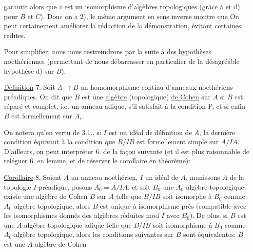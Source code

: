 
garantit alors que $v$ est un isomorphisme d'algèbres topologiques (grâce
à  et d) pour $B$ et $C$). Donc  on a 2), 
 le même argument en
sens inverse montre que  
On peut certainement améliorer la rédaction de la démonstration, évitant certaines redites.

Pour simplifier, nous nous restreindrons par la suite à des hypothèses
noethériennes (permettant de nous débarrasser en particulier de la désagréable hypothèse d) sur $B$).

\uline{Définition} 7. Soit $A\longrightarrow B$ un homomorphisme continu d'anneaux noethériens
préadiques. On dit que $B$ est une \uline{algèbre} (topologique) \uline{de Cohen} sur $A$
si  $B$ est séparé et complet, i.e.  un anneau adique,
  s'il satisfait à la condition P, et si enfin  $B$ est formellement
  sur $A$, 

On notera qu'en vertu de 3.1., si $I$ est un idéal de définition de $A$,
la dernière condition équivaut à la condition que $B/IB$ est formellement
simple sur $A/IA$. D'ailleurs, on peut interpréter 6. de la façon
suivante (et il est  plus raisonnable de reléguer 6. en lemme,
et de réserver le corollaire en théorème):

\uline{Corollaire} 8. Soient $A$ un anneau  noethérien, $I$ un idéal de $A$,
munissons $A$ de la topologie $I$-préadique, posons $A_0=A/IA$, et soit $B_0$ une
$A_0$-algèbre topologique.  existe une algèbre de Cohen $B$ sur $A$ telle
que $B/IB$ soit isomorphe à $B_0$ comme $A_0$-algèbre topologique,
alors $B$ est unique à  isomorphisme près
 (compatible avec les isomorphismes donnés des algèbres
 réduites mod $I$ avec $B_0$). De plus, si $B$ est une $A$-algèbre topologique adique telle que $B/IB$
soit isomorphisme à $B_0$ comme $A_0$-algèbre topologique, alors les conditions
suivantes sur $B$ sont équivalentes:  $B$ est une $A$-algèbre de Cohen

